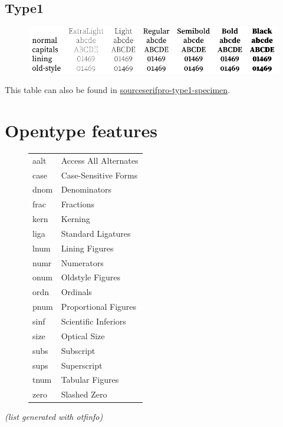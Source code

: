 \documentclass[10pt,a4paper,english]{article}
\newcommand*\file[1]{\href{run:#1.pdf}{#1}}
\begin{document}
\subsection{Type1}
\begin{figure}[ht]
	\centering
	\includegraphics{sourceserifpro-type1-specimen}
\end{figure}
This table can also be found in \file{sourceserifpro-type1-specimen}.

\newpage
\section{Opentype features}
\label{sec:otfinfo}

\begin{figure}[ht]
	\centering
	\begin{tabular}{>{\ttfamily}l l}
		aalt & Access All Alternates \\
		case & Case-Sensitive Forms \\
		dnom & Denominators \\
		frac & Fractions \\
		kern & Kerning \\
		liga & Standard Ligatures \\
		lnum & Lining Figures \\
		numr & Numerators \\
		onum & Oldstyle Figures \\
		ordn & Ordinals \\
		pnum & Proportional Figures \\
		sinf & Scientific Inferiors \\
		size & Optical Size \\
		subs & Subscript \\
		sups & Superscript \\
		tnum & Tabular Figures \\
		zero & Slashed Zero \\
	\end{tabular}
\end{figure}
\textit{(list generated with otfinfo)}
\end{document}
